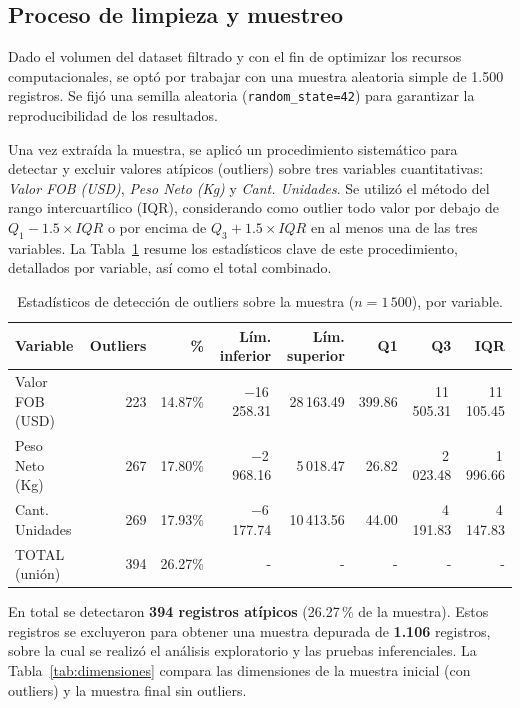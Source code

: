 \documentclass[12pt]{article}
\begin{document}
\subsection*{Proceso de limpieza y muestreo}

Dado el volumen del dataset filtrado y con el fin de optimizar los
recursos computacionales, se optó por trabajar con una muestra aleatoria
simple de 1.500 registros. Se fijó una semilla aleatoria
(\texttt{random\_state=42}) para garantizar la reproducibilidad de los
resultados.

Una vez extraída la muestra, se aplicó un procedimiento sistemático
para detectar y excluir valores atípicos (outliers) sobre tres
variables cuantitativas: \emph{Valor FOB (USD)}, \emph{Peso Neto (Kg)}
y \emph{Cant. Unidades}. Se utilizó el método del rango intercuartílico
(IQR), considerando como outlier todo valor por debajo de
\(Q_1 - 1.5 \times IQR\) o por encima de \(Q_3 + 1.5 \times IQR\) en al
menos una de las tres variables. La Tabla~\ref{tab:outliers} resume los
estadísticos clave de este procedimiento, detallados por variable, así
como el total combinado.

\begin{table}[htbp]
    \centering
    \caption{Estadísticos de detección de outliers sobre la muestra ($n = 1\,500$), por variable.}
    \label{tab:outliers}
    \footnotesize
    \setlength{\tabcolsep}{3pt}
    \begin{tabular}{lrrrrrrr}
        \toprule
        Variable & Outliers & \% & Lím. inferior & Lím. superior
        & Q1 & Q3 & IQR \\
        \midrule
        Valor FOB (USD) & 223 & 14.87\% & $-$16\,258.31 & 28\,163.49 & 399.86 & 11\,505.31 & 11\,105.45 \\
        Peso Neto (Kg) & 267 & 17.80\% & $-$2\,968.16 & 5\,018.47 & 26.82 & 2\,023.48 & 1\,996.66 \\
        Cant. Unidades & 269 & 17.93\% & $-$6\,177.74 & 10\,413.56 & 44.00 & 4\,191.83 & 4\,147.83 \\
        TOTAL (unión) & 394 & 26.27\% & - & - & - & - & - \\
        \bottomrule
    \end{tabular}
\end{table}
\FloatBarrier

En total se detectaron \textbf{394 registros atípicos} (26.27\,\% de la
muestra). Estos registros se excluyeron para obtener una muestra
depurada de \textbf{1.106} registros, sobre la cual se realizó el
análisis exploratorio y las pruebas inferenciales. La
Tabla~\ref{tab:dimensiones} compara las dimensiones de la
muestra inicial (con outliers) y la muestra final sin outliers.
\end{document}
